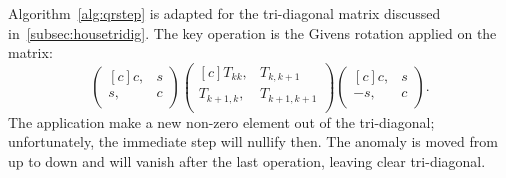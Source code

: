 \begin{refsection}
Algorithm~\ref{alg:qrstep} is adapted for the tri-diagonal
matrix discussed in~\ref{subsec:housetridig}. The key operation
is the Givens rotation applied on the matrix:
\[
  \begin{pmatrix*}[c]
    c, & s \\
    s, & c \\
  \end{pmatrix*}
  \begin{pmatrix*}[c]
    T_{kk}, & T_{k,k+1} \\
    T_{k+1,k}, & T_{k+1,k+1} \\
  \end{pmatrix*}
  \begin{pmatrix*}[c]
    c, & s \\
    -s, & c \\
  \end{pmatrix*}.
\]
The application make a new non-zero element out of the tri-diagonal;
unfortunately, the immediate step will nullify then. The anomaly
is moved from up to down and will vanish after the last operation,
leaving clear tri-diagonal.


\end{refsection}
